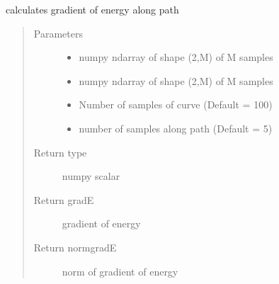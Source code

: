 \documentclass[letterpaper,10pt,english]{sphinxmanual}
\begin{document}
\begin{fulllineitems}
\label{\detokenize{geodesic:geodesic.calculate_gradE}}
calculates gradient of energy along path
\begin{quote}\begin{description}
\item[{Parameters}] \leavevmode\begin{itemize}
\item {} 
 \textendash{} numpy ndarray of shape (2,M) of M samples

\item {} 
 \textendash{} numpy ndarray of shape (2,M) of M samples

\item {} 
 \textendash{} Number of samples of curve (Default = 100)

\item {} 
 \textendash{} number of samples along path (Default = 5)

\end{itemize}

\item[{Return type}] \leavevmode
numpy scalar

\item[{Return gradE}] \leavevmode
gradient of energy

\item[{Return normgradE}] \leavevmode
norm of gradient of energy

\end{description}\end{quote}

\end{fulllineitems}

\end{document}
